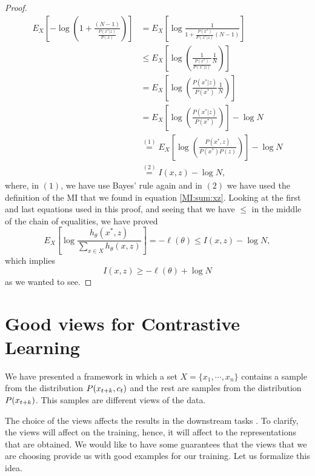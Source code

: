 \begin{proof}
\begin{align*}
E_X\left[ -\log\left( 1+ \frac{ (N-1)}{\frac{P(x^*|z)} {P(x)}} \right)\right] &  =
E_X\left[ \log \frac{1}{ 1+ \frac{P(x^*)}{P(x^*|z)}(N-1)}\right] \\
& \leq E_X\left[ \log\left(\frac{1}{\frac{P(x^*)}{P(x^*|z)}}\frac{1}{N}\right)\right]\\
& = E_X\left[ \log\left(\frac{P(x^*|z)}{P(x^*)} \frac{1}{N}\right)\right]\\
& = E_X \left[ \log\left(\frac{P(x^*|z)}{P(x^*)}\right)\right] - \log N \\
& \stackrel{(1)}{=} E_X \left[ \log\left(\frac{P(x^*,z)}{P(x^*)P(z)}\right)\right] - \log N\\
& \stackrel{(2)}{=} I(x,z) - \log N,
\end{align*}
where, in $(1)$, we have use Bayes' rule again and in $(2)$ we have used the definition of the MI that we found in equation \eqref{MI:sum:xz}. Looking at the first and last equations used in this proof, and seeing that we have $\leq$ in the middle of the chain of equalities, we have proved
\[
    E_X \left[ \log \frac{h_\theta(x^*,z)}{\sum_{x \in X}h_\theta(x,z)}\right] = - \ell (\theta) \leq I(x,z) - \log N,
\]
which implies 
\[
I(x,z) \geq -\ell(\theta)+ \log N  
\]
as we wanted to see.   
\end{proof}


\section{Good views for Contrastive Learning}

We have presented a framework in which a set $X = \{x_1,\cdots,x_n\}$ contains a sample from the distribution $P(x_{t+k},c_t)$ and the rest are samples from the distribution $P(x_{t+k})$. This samples are different views of the data. 

The choice of the views affects the results in the downstream tasks \citep{tian_what_2020}. To clarify, the views will affect on the training, hence, it will affect to the representations that are obtained. We would like to have some guarantees that the views that we are choosing provide us with good examples for our training. Let us formalize this idea.

